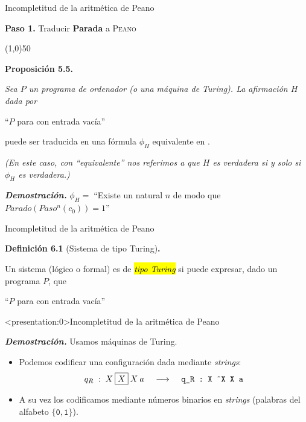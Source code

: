 \documentclass[10pt,xcolor=dvipsnames,aspectratio=169,spanish]{beamer}
\makeatletter
\let\HL\hl
\renewcommand\hl{%
  \let\set@color\beamerorig@set@color
  \let\reset@color\beamerorig@reset@color
  \HL}
\newcommand{\hle}[1]{\hl{\emph{#1}}}
\makeatother
\begin{document}
\begin{frame}{Incompletitud de la aritmética de Peano}

\begin{center}
    \textbf{Paso 1.} Traducir \textbf{Parada} a \textsc{Peano}

    \line(1,0){50}
\end{center}

\vspace{5mm}

\textbf{Proposición 5.5.} {\itshape
Sea $P$ un programa de ordenador (o una máquina de Turing). La afirmación $H$ dada por
\begin{center}
    ``$P$ para con entrada vacía''
\end{center}
puede ser traducida en una fórmula $\phi_H$ equivalente en .} {\itshape (En este caso, con ``equivalente'' nos referimos a que $H$ es verdadera si y solo si $\phi_H$ es verdadera.)}

\vspace{5mm}

\pause

\textbf{\emph{Demostración.}}
$\phi_H=\;$``Existe un natural $n$ de modo que $Parado(Paso^n(c_0))=1$''\hfill\square

\end{frame}


\begin{frame}{Incompletitud de la aritmética de Peano}

\textbf{Definición 6.1} (Sistema de tipo Turing)\textbf{.}

Un sistema (lógico o formal) es de \hle{tipo Turing} si puede expresar, dado un programa $P$, que
\begin{center}
    ``$P$ para con entrada vacía''
\end{center}

\end{frame}


\begin{frame}<presentation:0>{Incompletitud de la aritmética de Peano}

\textbf{\emph{Demostración.}} Usamos máquinas de Turing.

\begin{itemize}
    \pause
    \item Podemos codificar una configuración dada mediante \emph{strings}:
    $$
    q_R\;:\;X\:\fbox{$X$}\:X\:a \;\;\;\; \longrightarrow \;\;\;\; \texttt{q\_R : X \^{}X X a}
    $$
    \vspace*{-5mm}
    \pause
    \item A su vez los codificamos mediante números binarios en \emph{strings} (palabras del alfabeto $\{\texttt{0}, \texttt{1}\}$).
\end{itemize}



\end{frame}
\end{document}
